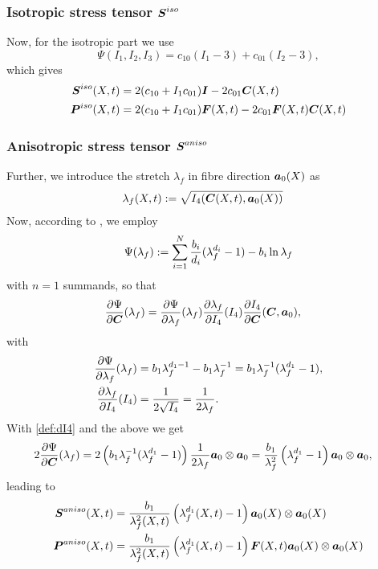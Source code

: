 \subsubsection{Isotropic stress tensor $\boldsymbol{S}^{iso}$}
Now, for the isotropic part we use
\[
	\Psi(I_1,I_2,I_3) = c_{10}(I_1-3) + c_{01}(I_2-3),
\]
which gives
\begin{align}
	\boldsymbol{S}^{iso}(X,t) &= 2(c_{10} + I_1c_{01})\boldsymbol{I} - 2c_{01}\boldsymbol{C}(X,t)\\
	\boldsymbol{P}^{iso}(X,t) &= 2(c_{10} + I_1c_{01})\boldsymbol{F}(X,t) - 2c_{01}\boldsymbol{F}(X,t)\boldsymbol{C}(X,t)
\end{align}

\subsubsection{Anisotropic stress tensor $\boldsymbol{S}^{aniso}$}
Further, we introduce the stretch $\lambda_f$ in fibre direction $\boldsymbol{a}_0(X)$ as
\begin{align*}
	\lambda_f(X,t) &:= \sqrt{I_4(\boldsymbol{C}(X,t),\boldsymbol{a}_0(X))}
\end{align*}
Now, according to \cite{Markert2005}, we employ
\begin{align*}
	\Psi(\lambda_f) := \sum\limits_{i=1}^{N} \frac{b_i}{d_i}(\lambda_f^{d_i} - 1) - b_i\ln\lambda_f
\end{align*}
with $n=1$ summands, so that
\begin{align}
	\frac{\partial \Psi}{\partial \boldsymbol{C}}(\lambda_f) &= \frac{\partial \Psi}{\partial \lambda_f}(\lambda_f)\frac{\partial \lambda_f}{\partial I_4}(I_4)\frac{\partial I_4}{\partial \boldsymbol{C}}(\boldsymbol{C},\boldsymbol{a}_0),\label{eq:dpsidC}
\end{align}
with
\begin{align*}
		 \frac{\partial \Psi}{\partial \lambda_f}(\lambda_f) &= b_1\lambda_f^{d_1-1} - b_1\lambda_f^{-1} = b_1\lambda_f^{-1}(\lambda_f^{d_1} - 1),\\
		 \frac{\partial \lambda_f}{\partial I_4}(I_4) &= \frac{1}{2\sqrt{I_4}} = \frac{1}{2\lambda_f}.
\end{align*}
With \eqref{def:dI4} and the above we get
\begin{align*}
	2\frac{\partial \Psi}{\partial \boldsymbol{C}}(\lambda_f) &= 2\left(b_1\lambda_f^{-1}(\lambda_f^{d_1} - 1)\right) \frac{1}{2\lambda_f}\boldsymbol{a}_0\otimes\boldsymbol{a}_0
	= \frac{b_1}{\lambda_f^2}\left(\lambda_f^{d_1} - 1\right) \boldsymbol{a}_0\otimes\boldsymbol{a}_0,
\end{align*}
leading to
\begin{align}
	\boldsymbol{S}^{aniso}(X,t) &= \frac{b_1}{\lambda_f^2(X,t)}\left(\lambda_f^{d_1}(X,t) - 1\right) \boldsymbol{a}_0(X)\otimes\boldsymbol{a}_0(X)\\
	\boldsymbol{P}^{aniso}(X,t) &= \frac{b_1}{\lambda_f^2(X,t)}\left(\lambda_f^{d_1}(X,t) - 1\right) \boldsymbol{F}(X,t)\boldsymbol{a}_0(X)\otimes\boldsymbol{a}_0(X)
\end{align}

